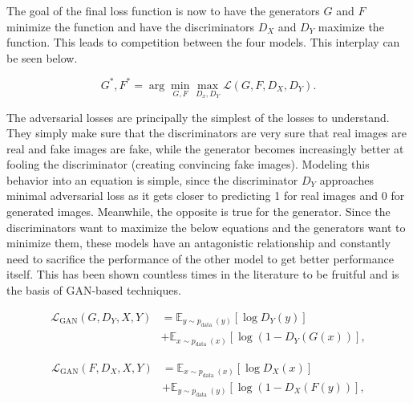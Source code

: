 \documentclass[12pt, fleqn, titlepage]{article}
\begin{document}
The goal of the final loss function is now to have the generators $G$ and $F$ minimize the function and have the discriminators $D_X$ and $D_Y$ maximize the function. This leads to competition between the four models. This interplay can be seen below.

\begin{equation}\label{minimax}
	G^{*}, F^{*}=\arg \min _{G, F} \max _{D_{x}, D_{Y}} \mathcal{L}\left(G, F, D_{X}, D_{Y}\right).
\end{equation}

The adversarial losses are principally the simplest of the losses to understand. They simply make sure that the discriminators are very sure that real images are real and fake images are fake, while the generator becomes increasingly better at fooling the discriminator (creating convincing fake images). Modeling this behavior into an equation is simple, since the discriminator $D_Y$ approaches minimal adversarial loss as it gets closer to predicting 1 for real images and 0 for generated images. Meanwhile, the opposite is true for the generator. Since the discriminators want to maximize the below equations and the generators want to minimize them, these models have an antagonistic relationship and constantly need to sacrifice the performance of the other model to get better performance itself. This has been shown countless times in the literature to be fruitful and is the basis of GAN-based techniques.

\[\begin{aligned}
	\mathcal{L}_{\mathrm{GAN}}\left(G, D_{Y}, X, Y\right) &=\mathbb{E}_{y \sim p_{\text {data }}(y)}\left[\log D_{Y}(y)\right] \\
	&+\mathbb{E}_{x \sim p_{\text {data }}(x)}\left[\log \left(1-D_{Y}(G(x))\right],\right.
\end{aligned}\]

\[\begin{aligned}
	\mathcal{L}_{\mathrm{GAN}}\left(F, D_{X}, X, Y\right) &=\mathbb{E}_{x \sim p_{\text {data }}(x)}\left[\log D_{X}(x)\right] \\
	&+\mathbb{E}_{y \sim p_{\text {data }}(y)}\left[\log \left(1-D_{X}(F(y))\right],\right.
\end{aligned}\]
\end{document}
